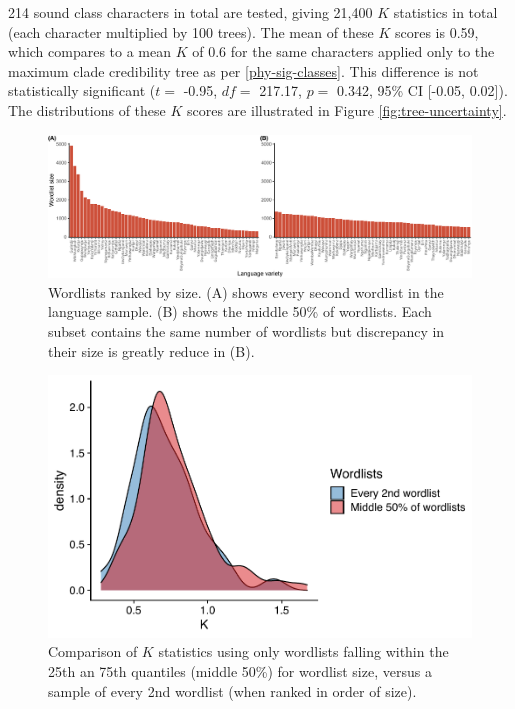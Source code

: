 214 sound class characters in total are tested, giving 21,400 \(K\) statistics in total (each character multiplied by 100 trees). The mean of these \(K\) scores is 0.59, which compares to a mean \(K\) of 0.6 for the same characters applied only to the maximum clade credibility tree as per \ref{phy-sig-classes}. This difference is not statistically significant (\(t=\) -0.95, \(df=\) 217.17, \(p=\) 0.342, 95\% CI {[}-0.05, 0.02{]}). The distributions of these \(K\) scores are illustrated in Figure \ref{fig:tree-uncertainty}.

\begin{figure}

{\centering \includegraphics[width=1\linewidth]{05-phylo-signal/fig/wordlist_subset_sizes} 

}

\caption{Wordlists ranked by size. (A) shows every second wordlist in the language sample. (B) shows the middle 50\% of wordlists. Each subset contains the same number of wordlists but discrepancy in their size is greatly reduce in (B).}\label{fig:wordlist-subset-sizes}
\end{figure}

\begin{figure}

{\centering \includegraphics[width=0.66\linewidth]{05-phylo-signal/fig/k-IQR-vs-Every2nd} 

}

\caption{Comparison of $K$ statistics using only wordlists falling within the 25th an 75th quantiles (middle 50\%) for wordlist size, versus a sample of every 2nd wordlist (when ranked in order of size).}\label{fig:wordlist-uncertainty}
\end{figure}

